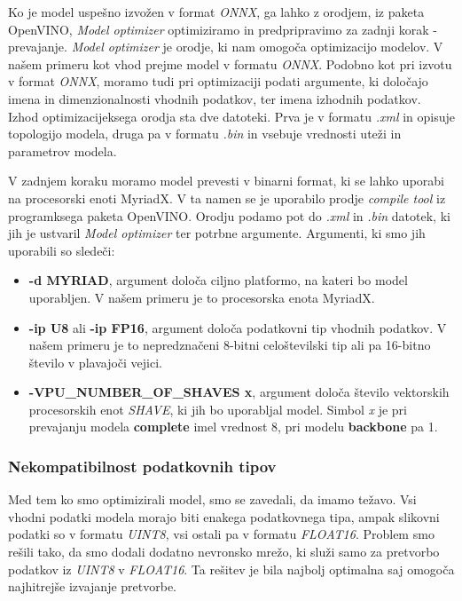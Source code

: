 \documentclass[a4paper,12pt,openright]{book}
\begin{document}
Ko je model uspešno izvožen v format \emph{ONNX}, ga lahko z orodjem, iz paketa OpenVINO, \emph{Model optimizer} optimiziramo in predpripravimo za zadnji korak - prevajanje. \emph{Model optimizer} je orodje, ki nam omogoča optimizacijo modelov. V našem primeru kot vhod prejme model v formatu \emph{ONNX}. Podobno kot pri izvotu v format \emph{ONNX}, moramo tudi pri optimizaciji podati argumente, ki določajo imena in dimenzionalnosti vhodnih podatkov, ter imena izhodnih podatkov. Izhod optimizacijeksega orodja sta dve datoteki. Prva je v formatu \emph{.xml} in opisuje topologijo modela, druga pa v formatu \emph{.bin} in vsebuje vrednosti uteži in parametrov modela.

V zadnjem koraku moramo model prevesti v binarni format, ki se lahko uporabi na procesorski enoti MyriadX. V ta namen se je uporabilo prodje \emph{compile tool} iz programksega paketa OpenVINO. Orodju podamo pot do \emph{.xml} in \emph{.bin} datotek, ki jih je ustvaril \emph{Model optimizer} ter potrbne argumente. Argumenti, ki smo jih uporabili so sledeči:

\begin{itemize}
    \item \textbf{-d MYRIAD}, argument določa ciljno platformo, na kateri bo model uporabljen. V našem primeru je to procesorska enota MyriadX.
    \item \textbf{-ip U8} ali \textbf{-ip FP16}, argument določa podatkovni tip vhodnih podatkov. V našem primeru je to nepredznačeni 8-bitni celoštevilski tip ali pa 16-bitno število v plavajoči vejici.
    \item \textbf{-VPU\_NUMBER\_OF\_SHAVES x}, argument določa število vektorskih procesorskih enot \emph{SHAVE}, ki jih bo uporabljal model. Simbol \emph{x} je pri prevajanju modela \textbf{complete} imel vrednost 8, pri modelu \textbf{backbone} pa 1.
\end{itemize}

\subsubsection{Nekompatibilnost podatkovnih tipov}
\label{section:nekompatibilnost}
Med tem ko smo optimizirali model, smo se zavedali, da imamo težavo. Vsi vhodni podatki modela morajo biti enakega podatkovnega tipa, ampak slikovni podatki so v formatu \emph{UINT8}, vsi ostali pa v formatu \emph{FLOAT16}. Problem smo rešili tako, da smo dodali dodatno nevronsko mrežo, ki služi samo za pretvorbo podatkov iz \emph{UINT8} v \emph{FLOAT16}. Ta rešitev je bila najbolj optimalna saj omogoča najhitrejše izvajanje pretvorbe.
\end{document}
